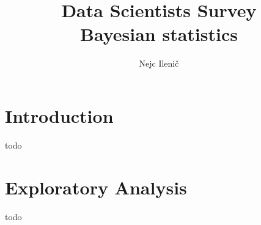 \documentclass[9pt]{article}
\begin{document}





\title{Data Scientists Survey \\ Bayesian statistics}
\author{Nejc Ileni\v{c}}
\date{}
\maketitle

\section{Introduction}
todo

\section{Exploratory Analysis}
todo
\end{document}
